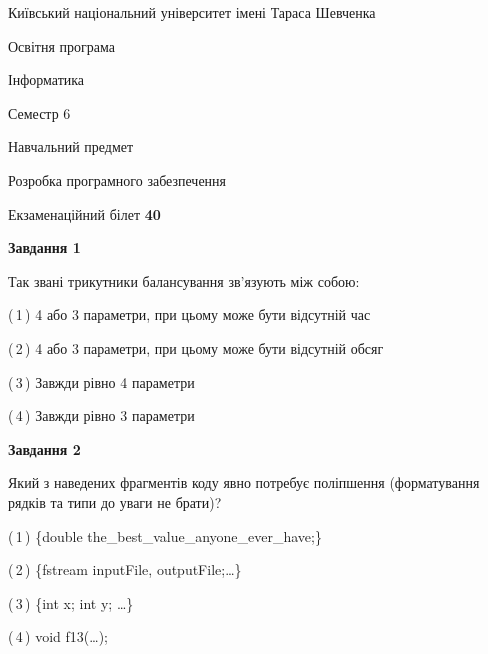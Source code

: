 \documentclass[10pt, ukrainian]{article}
\begin{document}
{{\begin {small}\par
{ \center  Київський національний університет імені Тараса Шевченка \par}
{\parbox {5 cm}{Освітня програма \hfill}{\parbox {7 cm}{Інформатика \hfill}}\parbox {6 cm}{\hfill Семестр 6}}\par
{\parbox {5 cm} {Навчальний предмет \hfill}\parbox {7 cm}{Розробка програмного забезпечення \hfill}\parbox {6cm}{\hfill}\par}\vspace{-7pt} \end{small}}{\center Екзаменаційний білет \No \textbf
{ 40 }\par}}
{
\begin {large}
{\begin {center}\textbf{Завдання 1}\end {center}}\par
Так звані трикутники балансування зв'язують між собою:\par
\vspace{2mm}



(\,1\,) 4 або 3 параметри, при цьому може бути відсутній час%



(\,2\,) 4 або 3 параметри, при цьому може бути відсутній обсяг %



(\,3\,) Завжди рівно 4 параметри%



(\,4\,) Завжди рівно 3 параметри%


{\begin {center}\textbf{Завдання 2}\end {center}}\par
Який з наведених фрагментів коду явно потребує поліпшення (форматування рядків та типи до уваги не брати)?\par
\vspace{2mm}



(\,1\,) \{double the\_best\_value\_anyone\_ever\_have;\} %



(\,2\,) \{fstream inputFile, outputFile;…\} %



(\,3\,) \{int x; int y; …\}%



(\,4\,) void f13(…);%



\end{large}}
\end{document}
